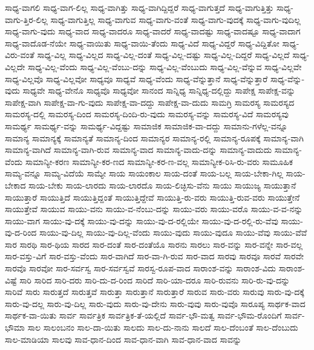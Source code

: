 {ಸಾಧ್ಯ-ವಾಗಲಿ
ಸಾಧ್ಯ-ವಾಗ-ಲಿಲ್ಲ
ಸಾಧ್ಯ-ವಾಗಿತ್ತು
ಸಾಧ್ಯ-ವಾಗಿದ್ದಿದ್ದರೆ
ಸಾಧ್ಯ-ವಾಗುತ್ತದೆ
ಸಾಧ್ಯ-ವಾಗುತ್ತಿತ್ತು
ಸಾಧ್ಯ-ವಾಗು-ತ್ತಿರ-ಲಿಲ್ಲ
ಸಾಧ್ಯ-ವಾಗುತ್ತಿಲ್ಲ
ಸಾಧ್ಯ-ವಾಗುವ
ಸಾಧ್ಯ-ವಾಗು-ವಂತೆ
ಸಾಧ್ಯ-ವಾಗು-ವುದಕ್ಕೆ
ಸಾಧ್ಯ-ವಾಗು-ವುದಿಲ್ಲ
ಸಾಧ್ಯ-ವಾಗು-ವುದು
ಸಾಧ್ಯ-ವಾದ
ಸಾಧ್ಯ-ವಾದರೂ
ಸಾಧ್ಯ-ವಾದರೆ
ಸಾಧ್ಯ-ವಾದಷ್ಟು
ಸಾಧ್ಯ-ವಾದಷ್ಟೂ
ಸಾಧ್ಯ-ವಾದಾಗ
ಸಾಧ್ಯ-ವಾದೊಡ-ನೆಯೇ
ಸಾಧ್ಯ-ವಾಯಿತು
ಸಾಧ್ಯ-ವಾಯಿ-ತೆಂದು
ಸಾಧ್ಯ-ವಿದೆ
ಸಾಧ್ಯ-ವಿದ್ದರೆ
ಸಾಧ್ಯ-ವಿದ್ದಿತೋ
ಸಾಧ್ಯ-ವಿರು-ವಂತೆ
ಸಾಧ್ಯ-ವಿಲ್ಲ
ಸಾಧ್ಯ-ವಿಲ್ಲದ
ಸಾಧ್ಯ-ವಿಲ್ಲ-ದಂತೆ
ಸಾಧ್ಯ-ವಿಲ್ಲ-ದಷ್ಟು
ಸಾಧ್ಯ-ವಿಲ್ಲ-ದಿದ್ದರೆ
ಸಾಧ್ಯ-ವಿಲ್ಲದೆ
ಸಾಧ್ಯ-ವಿಲ್ಲದೇ
ಸಾಧ್ಯ-ವಿಲ್ಲ-ವೆಂದು
ಸಾಧ್ಯ-ವಿಲ್ಲ-ವೆಂಬು-ದನ್ನು
ಸಾಧ್ಯ-ವಿಲ್ಲ-ವೆಂಬುದು
ಸಾಧ್ಯ-ವಿಲ್ಲ-ವೆನ್ನುವ
ಸಾಧ್ಯ-ವಿಲ್ಲವೇ
ಸಾಧ್ಯ-ವಿಲ್ಲವೊ
ಸಾಧ್ಯ-ವಿಲ್ಲವೋ
ಸಾಧ್ಯವೂ
ಸಾಧ್ಯವೆ
ಸಾಧ್ಯ-ವೆಂದು
ಸಾಧ್ಯ-ವೆನ್ನುತ್ತಾನೆ
ಸಾಧ್ಯ-ವೆನ್ನುತ್ತಾರೆ
ಸಾಧ್ಯ-ವೆನ್ನು-ವುದು
ಸಾಧ್ಯವೇ
ಸಾಧ್ಯ-ವೇನೊ
ಸಾಧ್ಯವೊ
ಸಾಧ್ಯವೋ
ಸಾನಂದ
ಸಾನ್ನಿಧ್ಯ
ಸಾನ್ನಿಧ್ಯ-ದಲ್ಲಿದ್ದು
ಸಾಪೇಕ್ಷ
ಸಾಪೇಕ್ಷ-ವನ್ನು
ಸಾಪೇಕ್ಷ-ವಾಗಿ
ಸಾಪೇಕ್ಷ-ವಾ-ಗು-ವುದು
ಸಾಪೇಕ್ಷ-ವಾ-ದದ್ದು
ಸಾಪೇಕ್ಷ-ವಾ-ದುದು
ಸಾಮಗ್ರಿ
ಸಾಮರಸ್ಯ
ಸಾಮರಸ್ಯದ
ಸಾಮರಸ್ಯ-ದಲ್ಲಿ
ಸಾಮರಸ್ಯ-ದಿಂದ
ಸಾಮರಸ್ಯ-ದಿಂದಿ-ರು-ವುದು
ಸಾಮರಸ್ಯ-ವನ್ನು
ಸಾಮರಸ್ಯ-ವಿದೆ
ಸಾಮರಸ್ಯವು
ಸಾಮರ್ಥ್ಯ
ಸಾಮರ್ಥ್ಯ-ವನ್ನು
ಸಾಮರ್ಥ್ಯ-ವಿದ್ದಷ್ಟು
ಸಾಮಾಜಿಕ
ಸಾಮಾಜಿಕ-ವಾ-ದದ್ದು
ಸಾಮಾನು-ಗಳೆಲ್ಲ-ವನ್ನೂ
ಸಾಮಾನ್ಯ
ಸಾಮಾನ್ಯಕ್ಕೆ
ಸಾಮಾನ್ಯತೆ
ಸಾಮಾನ್ಯ-ದಿಂದ
ಸಾಮಾನ್ಯರ
ಸಾಮಾನ್ಯ-ರಲ್ಲಿ
ಸಾಮಾನ್ಯ-ರೂಪಕ್ಕೆ
ಸಾಮಾನ್ಯ-ವಾಗಿ
ಸಾಮಾನ್ಯ-ವಾಗಿದೆ
ಸಾಮಾನ್ಯ-ವಾಗಿ-ರುವ
ಸಾಮಾನ್ಯ-ವಾದ
ಸಾಮಾನ್ಯ-ವಾದು-ದನ್ನು
ಸಾಮಾನ್ಯ-ವಾದುದು
ಸಾಮಾನ್ಯ-ವೆಂದು
ಸಾಮಾನ್ಯೀ-ಕರಣ
ಸಾಮಾನ್ಯೀ-ಕರ-ಣದ
ಸಾಮಾನ್ಯೀ-ಕರ-ಣ-ವಲ್ಲ
ಸಾಮಾನ್ಯೀಕ-ರಿಸಿ-ರು-ವರು
ಸಾಮೂಹಿಕ
ಸಾಮ್ಯ-ವನ್ನೂ
ಸಾಮ್ಯ-ವಿದೆಯೆ
ಸಾಮ್ಯೇ
ಸಾಯ
ಸಾಯಂಕಾಲ
ಸಾಯ-ದಂತೆ
ಸಾಯ-ಬಲ್ಲ
ಸಾಯ-ಬೇಕಾ-ಗಿಲ್ಲ
ಸಾಯ-ಬೇಕಾದ
ಸಾಯ-ಬೇಕು
ಸಾಯ-ಲಾರದು
ಸಾಯ-ಲಾರದೊ
ಸಾಯ-ಲಿಚ್ಛಿಸು-ವೆನು
ಸಾಯು
ಸಾಯುಜ್ಯ
ಸಾಯುತ್ತಾನೆ
ಸಾಯುತ್ತಾರೆ
ಸಾಯುತ್ತಿದೆ
ಸಾಯುತ್ತಿದ್ದಂತೆ
ಸಾಯುತ್ತಿದ್ದೇವೆ
ಸಾಯುತ್ತಿ-ರು-ವರು
ಸಾಯುತ್ತಿ-ರುವ-ವರು
ಸಾಯುತ್ತೇನೆ
ಸಾಯುತ್ತೇವೆ
ಸಾಯುವ
ಸಾಯು-ವನು
ಸಾಯು-ವ-ನೆಂಬು-ದನ್ನು
ಸಾಯು-ವರು
ಸಾಯು-ವರೊ
ಸಾಯು-ವ-ವ-ನನ್ನು
ಸಾಯು-ವಾಗ
ಸಾಯು-ವು-ದಕ್ಕೆ
ಸಾಯು-ವು-ದನ್ನು
ಸಾಯು-ವು-ದ-ರಲ್ಲಿಯೇ
ಸಾಯು-ವು-ದ-ರಲ್ಲಿ-ರು-ವೆವು
ಸಾಯು-ವು-ದ-ರಿಂದ
ಸಾಯು-ವು-ದಿಲ್ಲ
ಸಾಯು-ವು-ದಿಲ್ಲ-ವೆಂದು
ಸಾಯು-ವುದು
ಸಾಯು-ವುದೂ
ಸಾಯು-ವೆವು
ಸಾಯು-ವೆವೆ
ಸಾರ
ಸಾರಥಿ
ಸಾರ-ಥಿಯ
ಸಾರದ
ಸಾರ-ದಂತೆ
ಸಾರ-ದಂತೆಯೊ
ಸಾರನು
ಸಾರಲು
ಸಾರ-ವನ್ನು
ಸಾರ-ವನ್ನೇ
ಸಾರ-ವಲ್ಲ
ಸಾರ-ವಸ್ತು-ವಿಗೆ
ಸಾರ-ವಸ್ತು-ವೆಂದು
ಸಾರ-ವಾಗಿದೆ
ಸಾರ-ವಾ-ಗಿ-ರುವ
ಸಾರ-ವಾದ
ಸಾರವು
ಸಾರವೂ
ಸಾರವೆ
ಸಾರವೇ
ಸಾರವೊ
ಸಾರವೋ
ಸಾರ-ಸರ್ವಸ್ವ
ಸಾರ-ಸರ್ವಸ್ವವೆ
ಸಾರಸ್ವ-ರೂಪ-ವಾದ
ಸಾರಾಂಶ-ವನ್ನು
ಸಾರಾಂಶ-ವಿದು
ಸಾರಾಂಶ-ವಿಷ್ಟೆ
ಸಾರಿ
ಸಾರಿದ
ಸಾರಿ-ದರು
ಸಾರಿ-ದು-ದ-ರಿಂದ
ಸಾರಿದೆ
ಸಾರಿ-ಯಾ-ದರೂ
ಸಾರಿ-ರುವನು
ಸಾರಿ-ರು-ವು-ದನ್ನು
ಸಾರಿವೆ
ಸಾರು
ಸಾರುತ್ತದೆ
ಸಾರುತ್ತವೆ
ಸಾರುತ್ತಾ
ಸಾರುತ್ತಾನೆ
ಸಾರುತ್ತಾರೆ
ಸಾರುವ
ಸಾರು-ವರು
ಸಾರುವು
ಸಾರು-ವು-ದಕ್ಕೆ
ಸಾರು-ವು-ದಲ್ಲ
ಸಾರು-ವು-ದಿಲ್ಲ
ಸಾರು-ವುದು
ಸಾರು-ವು-ದೇನು
ಸಾರು-ವುವು
ಸಾರು-ವುವೊ
ಸಾರೂಪ್ಯ
ಸಾರ್ಥಕ-ವಾದ
ಸಾರ್ಥಕ-ವಾ-ಯಿತು
ಸಾರ್ವ
ಸಾರ್ವತ್ರಿಕ
ಸಾರ್ವತ್ರಿಕ-ತೆ-ಯಲ್ಲಿದೆ
ಸಾರ್ವ-ಭೌ-ಮತ್ವ
ಸಾರ್ವ-ಭೌಮ-ರೊಂದಿಗೆ
ಸಾರ್ವ-ಭೌಮಾ
ಸಾಲ
ಸಾಲಂಬನಂ
ಸಾಲ-ದಾ-ಯಿತು
ಸಾಲದು
ಸಾಲ-ದು-ನಾನು
ಸಾಲದೆ
ಸಾಲ-ದೆಂಬಂತೆ
ಸಾಲ-ದೆಂಬುದು
ಸಾಲ-ಮಾಡಿಯಾ
ಸಾಲವು
ಸಾವ-ಧಾನ-ದಿಂದ
ಸಾವ-ಧಾನ-ವಾಗಿ
ಸಾವ-ಧಾನ-ವಾದ
ಸಾವನ್ನು
}
